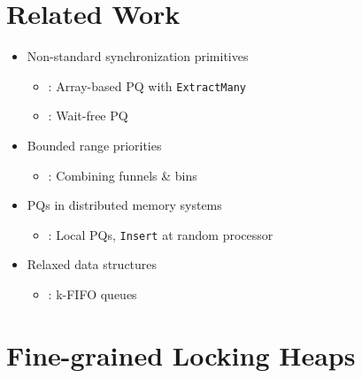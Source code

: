 \documentclass[usenames,dvipsnames]{beamer}
\begin{document}
\section{Related Work} \label{sec:related}

\begin{frame}{}
\begin{itemize}
\item Non-standard synchronization primitives
    \begin{itemize}
    \item \citeauthor{liu2012lock}: Array-based \ac{PQ} with \lstinline|ExtractMany|
    \item \citeauthor{israeli1993efficient}: Wait-free \ac{PQ}
    \end{itemize}

\item Bounded range priorities
    \begin{itemize}
    \item \citeauthor{shavit1999scalable}: Combining funnels \& bins
    \end{itemize}

\item \acp{PQ} in distributed memory systems
    \begin{itemize}
    \item \citeauthor{sanders1998randomized}: Local \acp{PQ}, \lstinline|Insert| at random processor
    \end{itemize}

\item Relaxed data structures
    \begin{itemize}
    \item \citeauthor{kirsch2012fast}: k-FIFO queues
    \end{itemize}

\end{itemize}
\end{frame}

\section{Fine-grained Locking Heaps} \label{sec:locking}
\end{document}
